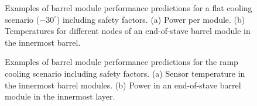\begin{figure}[ht]
\centering
{}\quad\quad
{}
\caption{Examples of barrel module performance predictions for a flat cooling scenario ($-30^\circ$) including safety factors. (a) Power per module. (b) Temperatures for different nodes of an end-of-stave barrel module in the innermost barrel.}
\label{fig:moduleflatperformance}
\end{figure}

\begin{figure}[ht]
\centering
{}\quad\quad
{}
\caption{Examples of barrel module performance predictions for the ramp cooling scenario including safety factors. (a) Sensor temperature in the innermost barrel modules. (b) Power in an end-of-stave barrel module in the innermost layer.}
\label{fig:modulerampperformance}
\end{figure}

